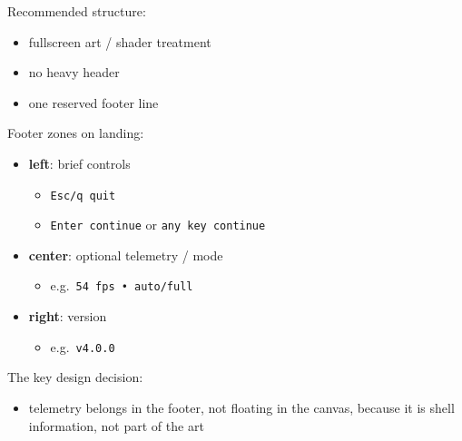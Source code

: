 Recommended structure:

\begin{itemize}
\tightlist
\item
  fullscreen art / shader treatment
\item
  no heavy header
\item
  one reserved footer line
\end{itemize}

Footer zones on landing:

\begin{itemize}
\tightlist
\item
  \textbf{left}: brief controls

  \begin{itemize}
  \tightlist
  \item
    \texttt{E\allowbreak{}s\allowbreak{}c\allowbreak{}/\allowbreak{}q\allowbreak{} \allowbreak{}q\allowbreak{}u\allowbreak{}i\allowbreak{}t}
  \item
    \texttt{E\allowbreak{}n\allowbreak{}t\allowbreak{}e\allowbreak{}r\allowbreak{} \allowbreak{}c\allowbreak{}o\allowbreak{}n\allowbreak{}t\allowbreak{}i\allowbreak{}n\allowbreak{}u\allowbreak{}e} or \texttt{a\allowbreak{}n\allowbreak{}y\allowbreak{} \allowbreak{}k\allowbreak{}e\allowbreak{}y\allowbreak{} \allowbreak{}c\allowbreak{}o\allowbreak{}n\allowbreak{}t\allowbreak{}i\allowbreak{}n\allowbreak{}u\allowbreak{}e}
  \end{itemize}
\item
  \textbf{center}: optional telemetry / mode

  \begin{itemize}
  \tightlist
  \item
    e.g.~\texttt{5\allowbreak{}4\allowbreak{} \allowbreak{}f\allowbreak{}p\allowbreak{}s\allowbreak{} \allowbreak{}•\allowbreak{} \allowbreak{}a\allowbreak{}u\allowbreak{}t\allowbreak{}o\allowbreak{}/\allowbreak{}f\allowbreak{}u\allowbreak{}l\allowbreak{}l}
  \end{itemize}
\item
  \textbf{right}: version

  \begin{itemize}
  \tightlist
  \item
    e.g.~\texttt{v\allowbreak{}4\allowbreak{}.\allowbreak{}0\allowbreak{}.\allowbreak{}0}
  \end{itemize}
\end{itemize}

The key design decision:

\begin{itemize}
\tightlist
\item
  telemetry belongs in the footer, not floating in the canvas, because it is shell information, not part of the art
\end{itemize}

